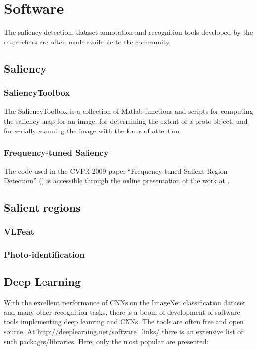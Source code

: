 \section{Software}
\label{sec:soft}

The saliency detection, dataset annotation and recognition tools developed by the researchers are often made available to the community.

\subsection{Saliency}
\subsubsection{SaliencyToolbox}\label{subsec:saltool}
The SaliencyToolbox is a collection of Matlab functions and scripts for computing the saliency map for an image, for determining the extent of a proto-object, and for serially scanning the image with the focus of attention. 

\subsubsection{Frequency-tuned Saliency}
The code used in the CVPR 2009 paper ``Frequency-tuned Salient Region Detection'' (\cite{LCAV-CONF-2009-012}) is accessible through the online presentation of the work at \cite{achantaCVPR09}.


\subsection{Salient regions}\label{soft:salreg:sec}
\subsubsection{VLFeat}\label{vlfeat:sec}
\subsubsection{Photo-identification}


\subsection{Deep Learning}
With the excellent performance of CNNs on the ImageNet classification dataset and many other recognition tasks, there is a boom of development of software tools implementing deep leanring and CNNs. 
The tools are often free and open source. At \url{http://deeplearning.net/software_links/} there is an extensive list of such packages/libraries. Here, only the most popular are presented:
